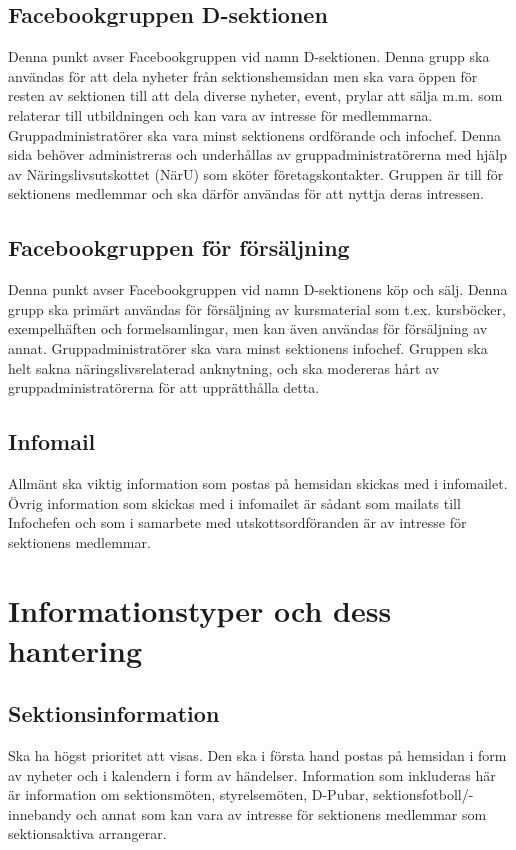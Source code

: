 \documentclass{datateknologsektionen-document}
\begin{document}
\subsection{Facebookgruppen D-sektionen}
Denna punkt avser Facebookgruppen vid namn D-sektionen. Denna grupp ska användas för
att dela nyheter från sektionshemsidan men ska vara öppen för resten av sektionen till att dela
diverse nyheter, event, prylar att sälja m.m. som relaterar till utbildningen och kan vara av
intresse för medlemmarna. Gruppadministratörer ska vara minst sektionens ordförande och
infochef. Denna sida behöver administreras och underhållas av gruppadministratörerna med
hjälp av Näringslivsutskottet (NärU) som sköter företagskontakter. Gruppen är till för
sektionens medlemmar och ska därför användas för att nyttja deras intressen.
\subsection{Facebookgruppen för försäljning}
Denna punkt avser Facebookgruppen vid namn D-sektionens köp och sälj. Denna grupp ska
primärt användas för försäljning av kursmaterial som t.ex. kursböcker, exempelhäften och
formelsamlingar, men kan även användas för försäljning av annat. Gruppadministratörer ska
vara minst sektionens infochef. Gruppen ska helt sakna näringslivsrelaterad anknytning, och
ska modereras hårt av gruppadministratörerna för att upprätthålla detta.
\subsection{Infomail}
Allmänt ska viktig information som postas på hemsidan skickas med i infomailet. Övrig
information som skickas med i infomailet är sådant som mailats till Infochefen och som i
samarbete med utskottsordföranden är av intresse för sektionens medlemmar.
\section{Informationstyper och dess hantering}
\subsection{Sektionsinformation}
Ska ha högst prioritet att visas. Den ska i första hand postas på hemsidan i form av nyheter
och i kalendern i form av händelser. Information som inkluderas här är information om
sektionsmöten, styrelsemöten, D-Pubar, sektionsfotboll/-innebandy och annat som kan vara
av intresse för sektionens medlemmar som sektionsaktiva arrangerar.
\end{document}
